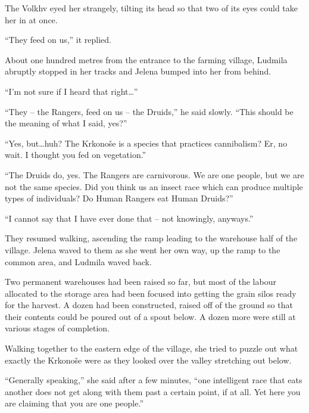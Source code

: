  

The Volkhv eyed her strangely, tilting its head so that two of its eyes could take her in at once.

 

“They feed on us,” it replied.

 

About one hundred metres from the entrance to the farming village, Ludmila abruptly stopped in her tracks and Jelena bumped into her from behind.

 

“I’m not sure if I heard that right…”

 

“They – the Rangers, feed on us – the Druids,” he said slowly. “This should be the meaning of what I said, yes?”

 

“Yes, but…huh? The Krkonoše is a species that practices cannibalism? Er, no wait. I thought you fed on vegetation.”

 

“The Druids do, yes. The Rangers are carnivorous. We are one people, but we are not the same species. Did you think us an insect race which can produce multiple types of individuals? Do Human Rangers eat Human Druids?”

 

“I cannot say that I have ever done that – not knowingly, anyways.”

 

They resumed walking, ascending the ramp leading to the warehouse half of the village. Jelena waved to them as she went her own way, up the ramp to the common area, and Ludmila waved back.

 

Two permanent warehouses had been raised so far, but most of the labour allocated to the storage area had been focused into getting the grain silos ready for the harvest. A dozen had been constructed, raised off of the ground so that their contents could be poured out of a spout below. A dozen more were still at various stages of completion.

 

Walking together to the eastern edge of the village, she tried to puzzle out what exactly the Krkonoše were as they looked over the valley stretching out below.

 

“Generally speaking,” she said after a few minutes, “one intelligent race that eats another does not get along with them past a certain point, if at all. Yet here you are claiming that you are one people.”

